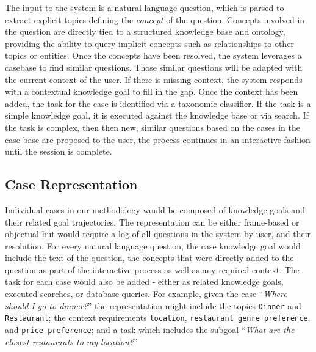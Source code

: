 \documentclass[11pt,letterpaper]{article}
\begin{document}
The input to the system is a natural language question, which is parsed to extract explicit topics defining the \textit{concept} of the question. Concepts involved in the question are directly tied to a structured knowledge base and ontology, providing the ability to query implicit concepts such as relationships to other topics or entities. Once the concepts have been resolved, the system leverages a casebase to find similar questions. Those similar questions will be adapted with the current context of the user. If there is missing context, the system responds with a contextual knowledge goal to fill in the gap. Once the context has been added, the task for the case is identified via a taxonomic classifier. If the task is a simple knowledge goal, it is executed against the knowledge base or via search. If the task is complex, then then new, similar questions based on the cases in the case base are proposed to the user, the process continues in an interactive fashion until the session is complete.

\subsection{Case Representation}

Individual cases in our methodology would be composed of knowledge goals and their related goal trajectories. The representation can be either frame-based or objectual but would require a log of all questions in the system by user, and their resolution. For every natural language question, the case knowledge goal would include the text of the question, the concepts that were directly added to the question as part of the interactive process as well as any required context. The task for each case would also be added - either as related knowledge goals, executed searches, or database queries. For example, given the case ``\textit{Where should I go to dinner?}'' the representation might include the topics \texttt{Dinner} and \texttt{Restaurant}; the context requirements \texttt{location}, \texttt{restaurant genre preference}, and \texttt{price preference}; and a task which includes the subgoal ``\textit{What are the closest restaurants to my location?}''
\end{document}
